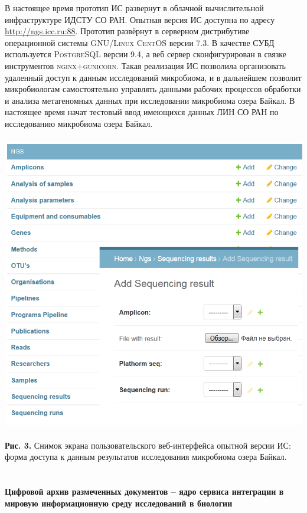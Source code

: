 \documentclass[a4paper,12pt,openany,final]{extreport}
\begin{document}
В настоящее время прототип ИС развернут в облачной вычислительной
инфраструктуре ИДСТУ СО РАН. Опытная версия ИС доступна по адресу
\href{http://ngs.icc.ru:88}{{http://ngs.icc.ru:88}}. Прототип развёрнут
в серверном дистрибутиве операционной системы \textsc{GNU/Linux CentOS}
версии 7.3. В качестве СУБД используется \textsc{PostgreSQL} версии 9.4,
а веб сервер сконфигурирован в связке инструментов
\textsc{nginx+gunicorn}. Такая реализация ИС позволила организовать
удаленный доступ к данным исследований микробиома, и в дальнейшем
позволит микробиологам самостоятельно управлять данными рабочих
процессов обработки и анализа метагеномных данных при исследовании
микробиома озера Байкал. В настоящее время начат тестовый ввод имеющихся
данных ЛИН СО РАН по исследованию микробиома озера Байкал.

\includegraphics[width=5.31181in,height=5.13056in]{media/image17.png}

\textbf{Рис. 3.} Снимок экрана пользовательского веб-интерфейса опытной
версии ИС: форма доступа к данным результатов исследования микробиома
озера Байкал.

\chapter{}\label{chap:7} \textbf{Цифровой архив размеченных документов -- ядро
сервиса интеграции в мировую информационную среду исследований в
биологии}
\end{document}
